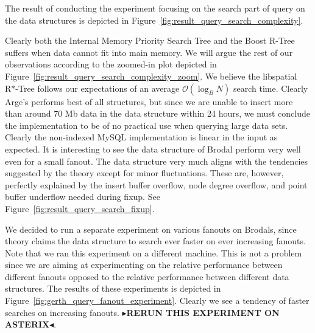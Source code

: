 \documentclass[twoside,11pt,openright]{report}
\newcommand{\todo}[1]{{\color[rgb]{.5,0,0}\textbf{$\blacktriangleright$#1$\blacktriangleleft$}}}
\begin{document}
The result of conducting the experiment focusing on the search part of query on the data structures is depicted in Figure~\ref{fig:result_query_search_complexity}.

Clearly both the Internal Memory Priority Search Tree and the Boost R-Tree suffers when data cannot fit into main memory. We will argue the rest of our observations according to the zoomed-in plot depicted in Figure~\ref{fig:result_query_search_complexity_zoom}. We believe the libspatial R*-Tree follows our expectations of an average $\mathcal{O}(\log_B N)$ search time. Clearly Arge's performs best of all structures, but since we are unable to insert more than around 70 Mb data in the data structure within 24 hours, we must conclude the implementation to be of no practical use when querying large data sets. Clearly the non-indexed MySQL implementation is linear in the input as expected. It is interesting to see the data structure of Brodal perform very well even for a small fanout. The data structure very much aligns with the tendencies suggested by the theory except for minor fluctuations. These are, however, perfectly explained by the insert buffer overflow, node degree overflow, and point buffer underflow needed during fixup. See Figure~\ref{fig:result_query_search_fixup}.

We decided to run a separate experiment on various fanouts on Brodals, since theory claims the data structure to search ever faster on ever increasing fanouts.
Note that we ran this experiment on a different machine. This is not a problem since we are aiming at experimenting on the relative performance between different fanouts opposed to the relative performance between different data structures. The results of these experiments is depicted in Figure~\ref{fig:gerth_query_fanout_experiment}.
Clearly we see a tendency of faster searches on increasing fanouts. \todo{RERUN THIS EXPERIMENT ON ASTERIX}.

\clearpage
\end{document}
